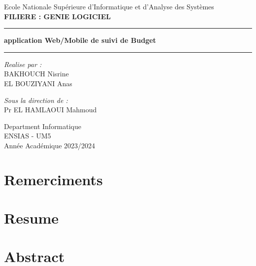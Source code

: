\documentclass[12pt,twoside]{report}
\begin{document}
\begin{titlepage}
\begin{center}
  {\huge Ecole Nationale Supérieure d’Informatique et d’Analyse des Systèmes}\\
  \vspace{0.5cm}
  \textbf{FILIERE : GENIE LOGICIEL}
  \vspace{0.5cm}
  \hrule
  \vspace{0.2cm}
  \textbf{\huge application Web/Mobile de suivi de Budget}
  \vspace{0.5cm}
  \hrule
  \vspace{1.5cm}
  \vfill
  \begin{minipage}[t]{0.45\textwidth}    %
        \textit{Realise par :}\\

        BAKHOUCH Nisrine\\
        EL BOUZIYANI Anas
    \end{minipage}%
    \begin{minipage}[t]{0.45\textwidth}    %
        \textit{Sous la direction de :}\\
        
        Pr EL HAMLAOUI Mahmoud
    \end{minipage}%
       \vspace{1.8cm}
       Department Informatique\\
       ENSIAS - UM5\\
       Année Académique 2023/2024
   \end{center}
\end{titlepage}
\shipout\null
{} %
\chapter{Remerciments} %


\chapter{Resume} %


\chapter{Abstract} %


\tableofcontents %
\listoffigures %
\listoftables %
\end{document}
